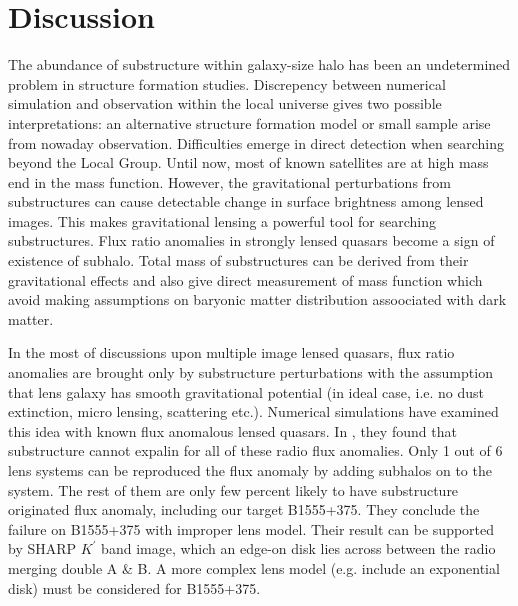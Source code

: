 \documentclass[useAMS,usenatbib]{mn2e}
\begin{document}
\section{Discussion}
The abundance of substructure within galaxy-size halo has been an undetermined problem in structure formation studies. Discrepency between numerical simulation and observation within the local universe gives two possible interpretations: an alternative structure formation model or small sample arise from nowaday observation. Difficulties emerge in direct detection when searching beyond the Local Group. Until now, most of known satellites are at high mass end in the mass function. However, the gravitational perturbations from substructures can cause detectable change in surface brightness among lensed images. This makes gravitational lensing a powerful tool for searching substructures. Flux ratio anomalies in strongly lensed quasars become a sign of existence of subhalo. Total mass of substructures can be derived from their gravitational effects and also give direct measurement of mass function which avoid making assumptions on baryonic matter distribution assoociated with dark matter.

In the most of discussions upon multiple image lensed quasars, flux ratio anomalies are brought only by substructure perturbations with the assumption that lens galaxy has smooth gravitational potential (in ideal case, i.e. no dust extinction, micro lensing, scattering etc.). Numerical simulations have examined this idea with known flux anomalous lensed quasars. In \citet{Xu14}, they found that substructure cannot expalin for all of these radio flux anomalies. Only 1 out of 6 lens systems can be reproduced the flux anomaly by adding subhalos on to the system. The rest of them are only few percent likely to have substructure originated flux anomaly, including our target B1555+375. They conclude the failure on B1555+375 with improper lens model. Their result can be supported by SHARP $K^{\prime}$ band image, which an edge-on disk lies across between the radio merging double A \& B. A more complex lens model (e.g. include an exponential disk) must be considered for B1555+375.
\end{document}
